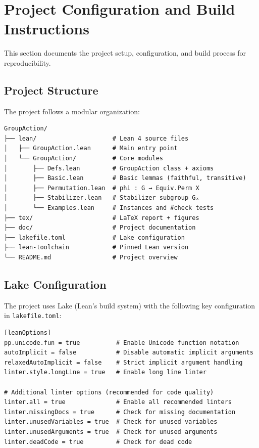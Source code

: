 \documentclass[
  12pt, %
]{assignment}
\begin{document}
\section{Project Configuration and Build Instructions}
This section documents the project setup, configuration, and build process for reproducibility.

\subsection{Project Structure}
The project follows a modular organization:
\begin{verbatim}
GroupAction/
├── lean/                     # Lean 4 source files
│   ├── GroupAction.lean      # Main entry point
│   └── GroupAction/          # Core modules
│       ├── Defs.lean         # GroupAction class + axioms
│       ├── Basic.lean        # Basic lemmas (faithful, transitive)
│       ├── Permutation.lean  # phi : G → Equiv.Perm X
│       ├── Stabilizer.lean   # Stabilizer subgroup Gₓ
│       └── Examples.lean     # Instances and #check tests
├── tex/                      # LaTeX report + figures
├── doc/                      # Project documentation
├── lakefile.toml             # Lake configuration
├── lean-toolchain            # Pinned Lean version
└── README.md                 # Project overview
\end{verbatim}

\subsection{Lake Configuration}
The project uses Lake (Lean's build system) with the following key configuration in \texttt{lakefile.toml}:

\begin{verbatim}
[leanOptions]
pp.unicode.fun = true          # Enable Unicode function notation
autoImplicit = false           # Disable automatic implicit arguments
relaxedAutoImplicit = false    # Strict implicit argument handling
linter.style.longLine = true   # Enable long line linter

# Additional linter options (recommended for code quality)
linter.all = true              # Enable all recommended linters
linter.missingDocs = true      # Check for missing documentation
linter.unusedVariables = true  # Check for unused variables
linter.unusedArguments = true  # Check for unused arguments
linter.deadCode = true         # Check for dead code
\end{verbatim}
\end{document}
